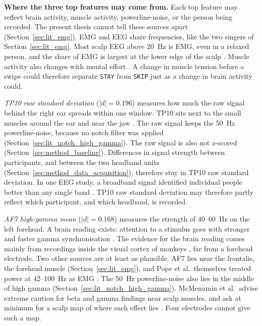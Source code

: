 \documentclass[12pt,a4paper]{report}
\begin{document}
\textbf{Where the three top features may come from.} Each top feature may reflect brain activity, muscle activity, powerline-noise, or the person being recorded. The present thesis cannot tell these sources apart (Section~\ref{sec:lit_emg}). EMG and EEG share frequencies, like the two singers of Section~\ref{sec:lit_emg}. Most scalp EEG above 20~Hz is EMG, even in a relaxed person, and the share of EMG is largest at the lower edge of the scalp \cite{whitham_scalp_2007}. Muscle activity also changes with mental effort \cite{mcmenamin_electromyogenic_2011}. A change in muscle tension before a swipe could therefore separate \texttt{STAY} from \texttt{SKIP} just as a change in brain activity could.

\emph{TP10 raw standard deviation} (\(|d| = 0.196\)) measures how much the raw signal behind the right ear spreads within one window. TP10 sits next to the small muscles around the ear and near the jaw \cite{mcmenamin_electromyogenic_2011}. The raw signal keeps the 50~Hz powerline-noise, because no notch filter was applied (Section~\ref{sec:lit_notch_high_gamma}). The raw signal is also not z-scored (Section~\ref{sec:method_baseline}). Differences in signal strength between participants, and between the two headband units (Section~\ref{sec:method_data_acquisition}), therefore stay in TP10 raw standard deviation. In one EEG study, a broadband signal identified individual people better than any single band \cite{ovi_frequency_2026}. TP10 raw standard deviation may therefore partly reflect which participant, and which headband, is recorded.

\emph{AF7 high-gamma mean} (\(|d| = 0.168\)) measures the strength of 40--60~Hz on the left forehead. A brain reading exists: attention to a stimulus goes with stronger and faster gamma synchronisation \cite{fries_rhythms_2015}. The evidence for the brain reading comes mainly from recordings inside the visual cortex of monkeys \cite{fries_rhythms_2015}, far from a forehead electrode. Two other sources are at least as plausible. AF7 lies near the frontalis, the forehead muscle (Section~\ref{sec:lit_emg}), and Pope et al.\ themselves treated power at 42--100~Hz as EMG \cite{pope_biocybernetic_1995-3}. The 50~Hz powerline-noise also lies in the middle of high gamma (Section~\ref{sec:lit_notch_high_gamma}). McMenamin et al.\ advise extreme caution for beta and gamma findings near scalp muscles, and ask at minimum for a scalp map of where each effect lies \cite{mcmenamin_electromyogenic_2011}. Four electrodes cannot give such a map.
\end{document}
